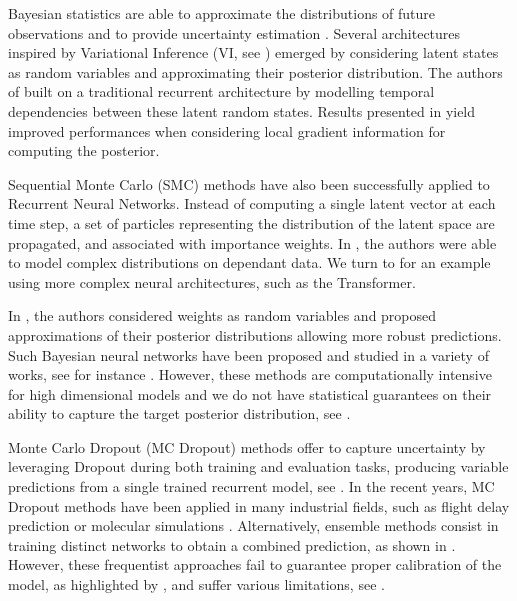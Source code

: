 \documentclass[conference]{IEEEtran}
\begin{document}
Bayesian statistics are able to approximate the distributions of future observations and to provide uncertainty estimation \cite{Hinton1995BayesianLF}.
Several architectures inspired by Variational Inference (VI, see \cite{Jordan2004AnIT}) emerged by considering latent states as random variables and approximating their posterior distribution.
The authors of \cite{Chung2015NIPS,10.5555/3157096.3157343} built on a traditional recurrent architecture by modelling temporal dependencies between these latent random states. Results presented in \cite{Fortunato2017bayesian} yield improved performances when considering local gradient information for computing the posterior.

Sequential Monte Carlo (SMC) methods have also been successfully applied to Recurrent Neural Networks.
Instead of computing a single latent vector at each time step, a set of particles representing the distribution of the latent space are propagated, and associated with importance weights.
In \cite{maddison2017filtering,naesseth2017variational}, the authors were able to model complex distributions on dependant data.
We turn to \cite{Martin2020TheMC} for an example using more complex neural architectures, such as the Transformer.

In \cite{Blundell2015}, the authors considered weights as random variables and proposed approximations of their posterior distributions allowing more robust predictions. Such Bayesian neural networks have been proposed and studied in a variety of works, see for instance \cite{hernandez2015probabilistic,khan2018fast,teye2018bayesian}. However, these methods are computationally intensive for high dimensional models and we do not have statistical guarantees on their ability to capture the target  posterior distribution, see \cite{NEURIPS2020_b6dfd418}.

Monte Carlo Dropout (MC Dropout) methods offer to capture uncertainty by leveraging Dropout during both training and evaluation tasks, producing variable predictions from a single trained recurrent model, see \cite{Gal2016NIPS}.
In the recent years, MC Dropout methods have been applied in many industrial fields, such as flight delay prediction \cite{Vandal2018} or molecular simulations \cite{Wen2020UncertaintyQI}.
Alternatively, ensemble methods consist in training distinct networks to obtain a combined prediction, as shown in \cite{Pearce2018}.
However, these frequentist approaches fail to guarantee proper calibration of the model, as highlighted by \cite{ashukha2020pitfalls}, and suffer various limitations, see \cite{Fong2020}.
\end{document}
